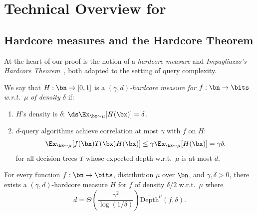 \documentclass[11pt]{article}
\newcommand{\gnote}[1]{\footnote{{\bf \color{violet}Guy}: {#1}}}
\begin{document}
\section{Technical Overview for~} 
\label{sec:tech-overview}


\subsection{Hardcore measures and the Hardcore Theorem} 

At the heart of our proof is the notion of a {\sl hardcore measure} and {\sl Impagliazzo’s Hardcore Theorem}~\cite{Imp95}, both adapted to the setting of query complexity.  

\begin{definition} 
\label{def:hardcore measure} 
We say that $H : \bn \to [0,1]$ is a {\sl $(\gamma,d)$-hardcore measure for $f : \bn \to \bits$ w.r.t.~$\mu$ of density $\delta$} if:
\begin{enumerate} 
\item $H$'s density is $\delta$: $\ds\Ex_{\bx\sim \mu}[H(\bx)] = \delta$. 
\item $d$-query algorithms achieve correlation at most $\gamma$ with $f$ on $H$:%
\[ \Ex_{\bx\sim \mu}[f(\bx)T(\bx)H(\bx)] \le \gamma \Ex_{\bx \sim \mu}[H(\bx)] = \gamma \delta.\]
for all decision trees $T$ whose expected depth w.r.t.~$\mu$ is at most $d$.
\end{enumerate}
\end{definition}


\begin{theorem}
    \label{thm:hardcore theorem for DTs}
For every function $f : \bn\to\bits$, distribution $\mu$ over $\bn$, and $\gamma,\delta > 0$, there exists a $(\gamma,d)$-hardcore measure $H$ for $f$ of density $\delta/2$ w.r.t.~$\mu$ where 
\[ d = \Theta\left(\frac{\gamma^2}{\log(1/\delta)}\right)  \overline{\mathrm{Depth}}^\mu(f,\delta). \]
\end{theorem}

\end{document}
